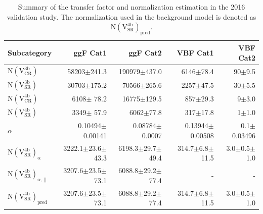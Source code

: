 \begin{table}[htb]
\caption[Summary of the transfer factor and normalization estimation in the 2016 validation test]{\label{bkg:tab:valfactor1}Summary of the transfer factor and normalization estimation in the 2016 validation study. The normalization used in the background model is denoted as $\mathrm{N(V_{SR}^{4b})_{pred}}$.}
\small
\centering
\begin{tabularx}{\textwidth}{l r r r r}
    \hline
    Subcategory                                 &   ggF Cat1               & ggF Cat2                & VBF Cat1                 & VBF Cat2              \\
    \hline
    $\mathrm{N(V_{CR}^{3b})}$                   &  58203$\pm$241.3         & 190979$\pm$437.0        &  6146$\pm$78.4           &     90$\pm$9.5        \\
    $\mathrm{N(V_{SR}^{3b})}$                   &  30703$\pm$175.2         &  70566$\pm$265.6        &  2257$\pm$47.5           &     30$\pm$5.5        \\
    $\mathrm{N(V_{CR}^{4b})}$                   &   6108$\pm$ 78.2         &  16775$\pm$129.5        &   857$\pm$29.3           &      9$\pm$3.0        \\
    $\mathrm{N(V_{SR}^{4b})}$                   &   3349$\pm$ 57.9         &   6062$\pm$77.8         &   317$\pm$17.8           &      1$\pm$1.0  \\
    $\alpha$                                    & 0.10494$\pm$0.00141      &0.08784$\pm$0.0007       &0.13944$\pm$0.00508       &    0.1$\pm$0.03496    \\
    $\mathrm{N(V_{SR}^{4b})_{\alpha}}$          &  3222.1$\pm$23.6$\pm$43.3& 6198.3$\pm$29.7$\pm$49.4&  314.7$\pm$6.8$\pm$11.5  &    3.0$\pm$0.5$\pm$1.0\\
    $\mathrm{N(V_{SR}^{4b})_{\alpha,\parallel}}$&  3207.6$\pm$23.5$\pm$73.1& 6088.8$\pm$29.2$\pm$77.4&         -                &  -                    \\
    $\mathrm{N(V_{SR}^{4b})_{pred}}$            &  3207.6$\pm$23.5$\pm$73.1& 6088.8$\pm$29.2$\pm$77.4&  314.7$\pm$6.8$\pm$11.5  &    3.0$\pm$0.5$\pm$1.0\\
    \hline
\end{tabularx}
\end{table}

